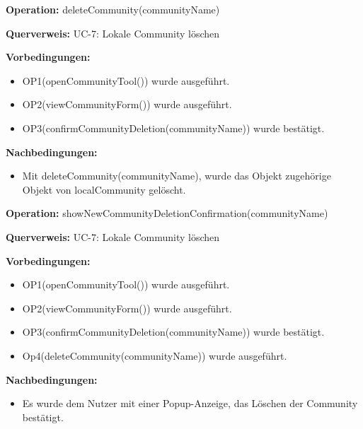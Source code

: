 \documentclass[a4paper,12pt]{article}
\begin{document}
	\begin{contractbox}
		\textbf{Operation:} deleteCommunity(communityName)
		
			\textbf{Querverweis:} UC-7: Lokale Community löschen
		
		\textbf{Vorbedingungen:}
		\begin{itemize}[noitemsep]
			\item OP1(openCommunityTool()) wurde ausgeführt.
			\item OP2(viewCommunityForm()) wurde ausgeführt.
			\item OP3(confirmCommunityDeletion(communityName)) wurde bestätigt.
		\end{itemize}
		
		\textbf{Nachbedingungen:}
		\begin{itemize}[noitemsep]
			\item Mit deleteCommunity(communityName), wurde das Objekt zugehörige Objekt von localCommunity gelöscht.
		\end{itemize}
	\end{contractbox}

	\begin{contractbox}
		\textbf{Operation:} showNewCommunityDeletionConfirmation(communityName)
		
			\textbf{Querverweis:} UC-7: Lokale Community löschen
		
		\textbf{Vorbedingungen:}
		\begin{itemize}[noitemsep]
			\item OP1(openCommunityTool()) wurde ausgeführt.
			\item OP2(viewCommunityForm()) wurde ausgeführt.
			\item OP3(confirmCommunityDeletion(communityName)) wurde bestätigt.
			\item Op4(deleteCommunity(communityName)) wurde ausgeführt.
		\end{itemize}
		
		\textbf{Nachbedingungen:}
		\begin{itemize}[noitemsep]
			\item Es wurde dem Nutzer mit einer Popup-Anzeige, das Löschen der Community bestätigt.
		\end{itemize}
	\end{contractbox}
\end{document}
